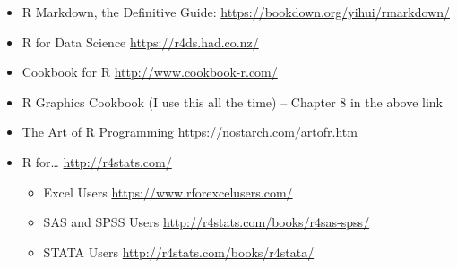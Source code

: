 \documentclass[]{article}
\providecommand{\tightlist}{%
  \setlength{\itemsep}{0pt}\setlength{\parskip}{0pt}}
\begin{document}
\begin{itemize}
\tightlist
\item
  R Markdown, the Definitive Guide:
  \url{https://bookdown.org/yihui/rmarkdown/}
\item
  R for Data Science \url{https://r4ds.had.co.nz/}
\item
  Cookbook for R \url{http://www.cookbook-r.com/}
\item
  R Graphics Cookbook (I use this all the time) -- Chapter 8 in the
  above link
\item
  The Art of R Programming \url{https://nostarch.com/artofr.htm}
\item
  R for\ldots{} \url{http://r4stats.com/}

  \begin{itemize}
  \tightlist
  \item
    Excel Users \url{https://www.rforexcelusers.com/}
  \item
    SAS and SPSS Users \url{http://r4stats.com/books/r4sas-spss/}
  \item
    STATA Users \url{http://r4stats.com/books/r4stata/}
  \end{itemize}
\end{itemize}
\end{document}
